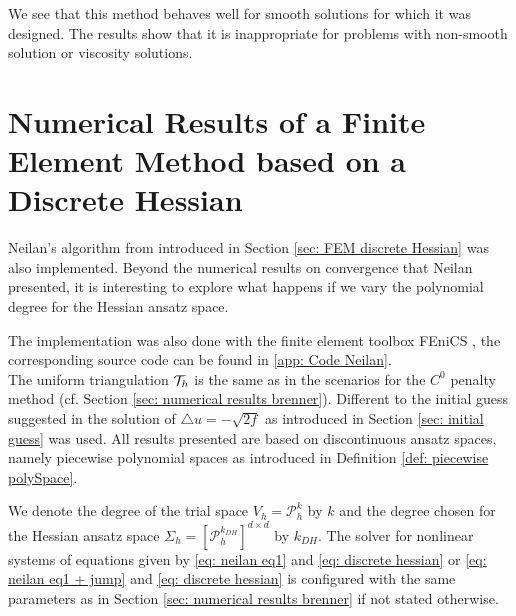 
We see that this method behaves well for smooth solutions for which it was designed. The results show that it is inappropriate for problems with non-smooth solution or viscosity solutions.

\section{Numerical Results of a Finite Element Method based on a Discrete Hessian}\label{sec: numerical results neilan}

Neilan's algorithm from \cite{Neilan2014} introduced in Section \ref{sec: FEM discrete Hessian} was also implemented.
Beyond the numerical results on convergence that Neilan presented, it is interesting to explore what happens if we vary the polynomial degree for the Hessian ansatz space. 

The implementation was also done with the finite element toolbox FEniCS \cite{FEniCS}, the corresponding source code can be found in \ref{app: Code Neilan}. \\
The uniform triangulation $\mathcal{T}_h$ is the same as in the scenarios for the $C^0$ penalty method (cf. Section \ref{sec: numerical results brenner}).
Different to the initial guess suggested in \cite{Neilan2014} the solution of $\triangle u = -\sqrt{2f}$ as introduced in Section \ref{sec: initial guess} was used. All results presented are based on discontinuous ansatz spaces, namely piecewise polynomial spaces as introduced in Definition \ref{def: piecewise polySpace}.

We denote the degree of the trial space $V_h=\mathcal P_h^k$ by $k$ and the degree chosen for the Hessian ansatz space $\Sigma_h = [\mathcal{P}_h^{k_{DH}}]^{d \times d}$ by $k_{DH}$. The solver for nonlinear systems of equations given by \eqref{eq: neilan eq1} and \eqref{eq: discrete hessian} or \eqref{eq: neilan eq1 + jump} and \eqref{eq: discrete hessian} is configured with the same parameters as in Section \ref{sec: numerical results brenner} if not stated otherwise. 









